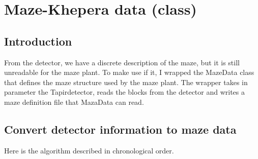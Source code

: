 \section{Maze-Khepera data (class)}
\label{sec:mkd}

\subsection{Introduction}
\label{sec:mkd:intro}

From the detector, we have a discrete description of the maze, but it 
is still unreadable for the maze plant. To make use if it, I wrapped 
the MazeData class that defines the maze structure used by the maze 
plant. The wrapper takes in parameter the Tapirdetector, reads the blocks 
from the detector and writes a maze definition file that MazaData 
can read.

\subsection{Convert detector information to maze data}
\label{sec:mkd:algo}
Here is the algorithm described in chronological order.



